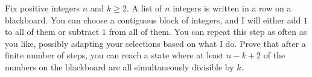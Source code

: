 Fix positive integers $n$ and $k\ge 2$. A list of $n$ integers is written in a row on a blackboard. You can choose a contiguous block of integers, and I will either add $1$ to all of them or subtract $1$ from all of them. You can repeat this step as often as you like, possibly adapting your selections based on what I do. Prove that after a finite number of steps, you can reach a state where at least $n-k+2$ of the numbers on the blackboard are all simultaneously divisible by $k$.